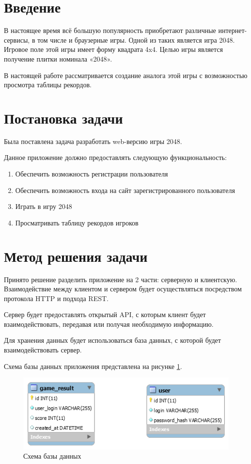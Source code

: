 \documentclass[hidelinks]{article}
\begin{document}

\tableofcontents
\pagebreak

\section{Введение}
В настоящее время всё большую популярность приобретают различные интернет-сервисы, в том числе и браузерные игры. Одной из таких является игра 2048. Игровое поле этой игры имеет форму квадрата 4x4. Целью игры является получение плитки номинала «2048». 

В настоящей работе рассматривается создание аналога этой игры с возможностью просмотра таблицы рекордов.

\section{Постановка задачи}
Была поставлена задача разработать web-версию игры 2048. 

Данное приложение должно предоставлять следующую функциональность: 
\begin{enumerate}
    \item Обеспечить возможность регистрации пользователя 
    \item Обеспечить возможность входа на сайт зарегистрированного пользователя 
    \item Играть в игру 2048 
    \item Просматривать таблицу рекордов игроков 
\end{enumerate}

\section{Метод решения задачи}
Принято решение разделить приложение на 2 части: серверную и клиентскую.
Взаимодействие между клиентом и сервером будет осуществляться посредством протокола HTTP и подхода REST.

Сервер будет предоставлять открытый API, с которым клиент будет взаимодействовать, передавая или получая необходимую информацию.

Для хранения данных будет использоваться база данных, с которой будет взаимодействовать сервер.

Схема базы данных приложения представлена на рисунке \ref{fig:db}.

\begin{figure}[H]
    \centering
    \includegraphics[scale=0.5]{img/db.png}
    \caption{Схема базы данных}
    \label{fig:db}
\end{figure}
\end{document}
